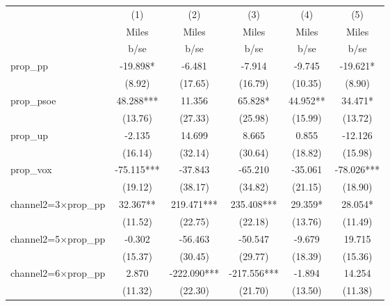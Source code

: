 \begin{tabular}{l*{5}{c}}
\toprule
                    &\multicolumn{1}{c}{(1)}&\multicolumn{1}{c}{(2)}&\multicolumn{1}{c}{(3)}&\multicolumn{1}{c}{(4)}&\multicolumn{1}{c}{(5)}\\
                    &\multicolumn{1}{c}{Miles}&\multicolumn{1}{c}{Miles}&\multicolumn{1}{c}{Miles}&\multicolumn{1}{c}{Miles}&\multicolumn{1}{c}{Miles}\\
                    &        b/se   &        b/se   &        b/se   &        b/se   &        b/se   \\
\midrule
prop\_pp             &     -19.898*  &      -6.481   &      -7.914   &      -9.745   &     -19.621*  \\
                    &      (8.92)   &     (17.65)   &     (16.79)   &     (10.35)   &      (8.90)   \\
prop\_psoe           &      48.288***&      11.356   &      65.828*  &      44.952** &      34.471*  \\
                    &     (13.76)   &     (27.33)   &     (25.98)   &     (15.99)   &     (13.72)   \\
prop\_up             &      -2.135   &      14.699   &       8.665   &       0.855   &     -12.126   \\
                    &     (16.14)   &     (32.14)   &     (30.64)   &     (18.82)   &     (15.98)   \\
prop\_vox            &     -75.115***&     -37.843   &     -65.210   &     -35.061   &     -78.026***\\
                    &     (19.12)   &     (38.17)   &     (34.82)   &     (21.15)   &     (18.90)   \\
channel2=3$\times$prop\_pp&      32.367** &     219.471***&     235.408***&      29.359*  &      28.054*  \\
                    &     (11.52)   &     (22.75)   &     (22.18)   &     (13.76)   &     (11.49)   \\
channel2=5$\times$prop\_pp&      -0.302   &     -56.463   &     -50.547   &      -9.679   &      19.715   \\
                    &     (15.37)   &     (30.45)   &     (29.77)   &     (18.39)   &     (15.36)   \\
channel2=6$\times$prop\_pp&       2.870   &    -222.090***&    -217.556***&      -1.894   &      14.254   \\
                    &     (11.32)   &     (22.30)   &     (21.70)   &     (13.50)   &     (11.38)   \\

\end{tabular}
